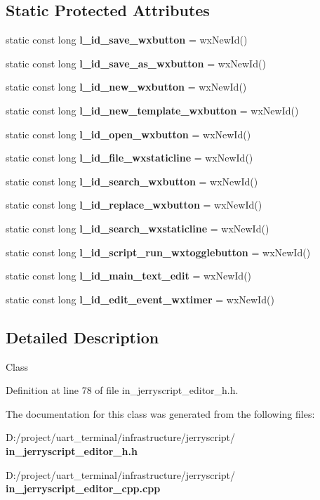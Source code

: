 \subsection*{Static Protected Attributes}
\begin{DoxyCompactItemize}
\item 
static const long \textbf{ l\+\_\+id\+\_\+save\+\_\+wxbutton} = wx\+New\+Id()
\item 
static const long {\bfseries l\+\_\+id\+\_\+save\+\_\+as\+\_\+wxbutton} = wx\+New\+Id()
\item 
static const long {\bfseries l\+\_\+id\+\_\+new\+\_\+wxbutton} = wx\+New\+Id()
\item 
static const long {\bfseries l\+\_\+id\+\_\+new\+\_\+template\+\_\+wxbutton} = wx\+New\+Id()
\item 
static const long {\bfseries l\+\_\+id\+\_\+open\+\_\+wxbutton} = wx\+New\+Id()
\item 
static const long {\bfseries l\+\_\+id\+\_\+file\+\_\+wxstaticline} = wx\+New\+Id()
\item 
static const long {\bfseries l\+\_\+id\+\_\+search\+\_\+wxbutton} = wx\+New\+Id()
\item 
static const long {\bfseries l\+\_\+id\+\_\+replace\+\_\+wxbutton} = wx\+New\+Id()
\item 
static const long {\bfseries l\+\_\+id\+\_\+search\+\_\+wxstaticline} = wx\+New\+Id()
\item 
static const long {\bfseries l\+\_\+id\+\_\+script\+\_\+run\+\_\+wxtogglebutton} = wx\+New\+Id()
\item 
static const long {\bfseries l\+\_\+id\+\_\+main\+\_\+text\+\_\+edit} = wx\+New\+Id()
\item 
static const long {\bfseries l\+\_\+id\+\_\+edit\+\_\+event\+\_\+wxtimer} = wx\+New\+Id()
\end{DoxyCompactItemize}


\subsection{Detailed Description}
Class 

Definition at line 78 of file in\+\_\+jerryscript\+\_\+editor\+\_\+h.\+h.



The documentation for this class was generated from the following files\+:\begin{DoxyCompactItemize}
\item 
D\+:/project/uart\+\_\+terminal/infrastructure/jerryscript/\textbf{ in\+\_\+jerryscript\+\_\+editor\+\_\+h.\+h}\item 
D\+:/project/uart\+\_\+terminal/infrastructure/jerryscript/\textbf{ in\+\_\+jerryscript\+\_\+editor\+\_\+cpp.\+cpp}\end{DoxyCompactItemize}
